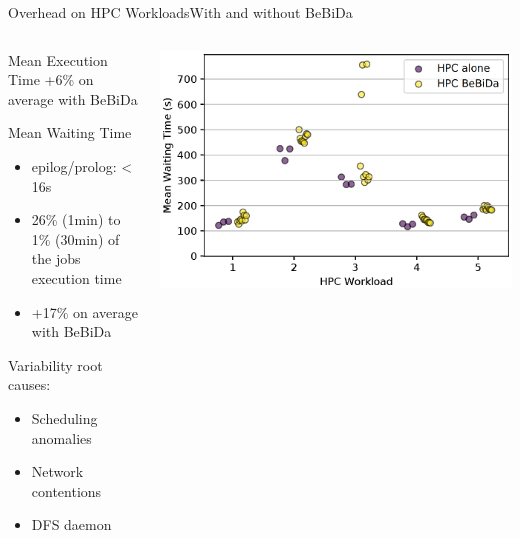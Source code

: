 \documentclass[10pt, compress, titleprogressbar, aspectratio=169]{beamer}
\begin{document}
        \begin{frame}{Overhead on HPC Workloads}{With and without BeBiDa}
            \begin{columns}
                \begin{column}{0.38\textwidth}
                    \begin{block}{Mean Execution Time}
                        +6\% on average with BeBiDa
                    \end{block}
                    \begin{exampleblock}{Mean Waiting Time}
                        \begin{itemize}
                            \item epilog/prolog: < 16s\\
                            \item 26\% (1min) to 1\% (30min) of the jobs execution time
                            \item +17\% on average with BeBiDa
                        \end{itemize}
                    \end{exampleblock}
                    Variability root causes:
                    \begin{itemize}
                        \item Scheduling anomalies
                        \item Network contentions
                        \item DFS daemon
                    \end{itemize}

                \end{column}
                \begin{column}{0.58\textwidth}
                    \begin{center}
                        \includegraphics[width=\linewidth, height=\textheight, keepaspectratio]{./img/fig/HPC_metrics.eps}
                    \end{center}
                \end{column}
            \end{columns}
        \end{frame}
\end{document}

